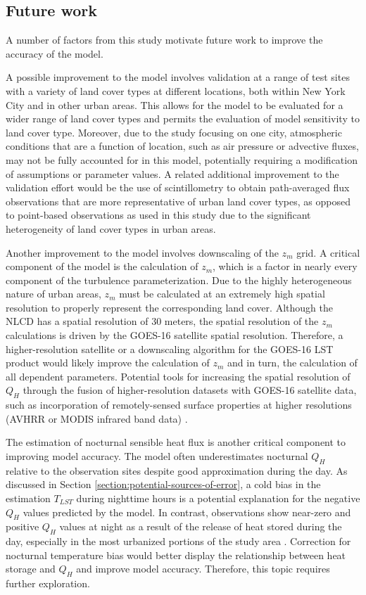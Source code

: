 \subsection{Future work} \label{section:future-work}
A number of factors from this study motivate future work to improve the accuracy of the model.

A possible improvement to the model involves validation at a range of test sites with a variety of land cover types at different locations, both within New York City and in other urban areas. This allows for the model to be evaluated for a wider range of land cover types and permits the evaluation of model sensitivity to land cover type. Moreover,  due to the study focusing on one city, atmospheric conditions that are a function of location, such as air pressure or advective fluxes, may not be fully accounted for in this model, potentially requiring a modification of assumptions or parameter values.  A related additional improvement to the validation effort would be the use of scintillometry to obtain path-averaged flux observations that are more representative of urban land cover types, as opposed to point-based observations as used in this study \citep{Crawford_2017, Lee_2015, Nadeau_2009} due to the significant heterogeneity of land cover types in urban areas. 

Another improvement to the model involves downscaling of the $z_m$ grid. A critical component of the model is the calculation of $z_m$, which is a factor in nearly every component of the turbulence parameterization. Due to the highly heterogeneous nature of urban areas, $z_m$ must be calculated at an extremely high spatial resolution to properly represent the corresponding land cover. Although the NLCD has a spatial resolution of 30 meters, the spatial resolution of the $z_m$ calculations is driven by the GOES-16 satellite spatial resolution. Therefore, a higher-resolution satellite or a downscaling algorithm for the GOES-16 LST product would likely improve the calculation of $z_m$ and in turn, the calculation of all dependent parameters.  Potential tools for increasing the spatial resolution of $Q_H$ through the fusion of higher-resolution datasets with GOES-16 satellite data, such as incorporation of remotely-sensed surface properties at higher resolutions (AVHRR or MODIS infrared band data) \citep{Bala_2019, chrysoulakis_urban_2018, Hrisko_2021}.

The estimation of nocturnal sensible heat flux is another critical component to improving model accuracy. The model often underestimates nocturnal $Q_H$ relative to the observation sites despite good approximation during the day.  As discussed in Section \ref{section:potential-sources-of-error}, a cold bias in the estimation $T_{LST}$ during nighttime hours is a potential explanation for the negative $Q_H$ values predicted by the model. In contrast, observations show near-zero and positive $Q_H$ values at night as a result of the release of heat stored during the day, especially in the most urbanized portions of the study area \citep{Grimmond_1999, Hrisko_2021}. Correction for nocturnal temperature bias would better display the relationship between heat storage and $Q_H$ and improve model accuracy. Therefore, this topic requires further exploration.

